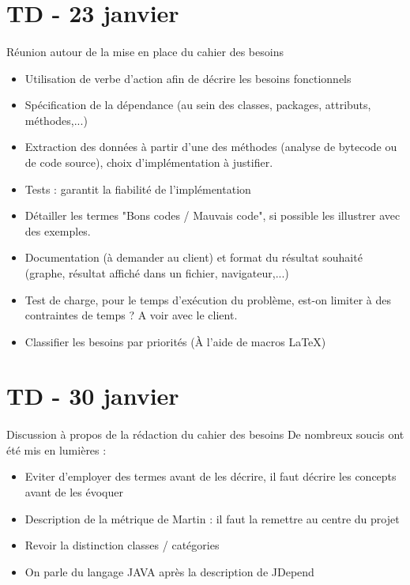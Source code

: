 \documentclass{scrartcl}
\begin{document}
\section{TD - 23 janvier}
\paragraph{}Réunion autour de la mise en place du cahier des besoins
\begin{itemize}
    \item Utilisation de verbe d'action afin de décrire les besoins fonctionnels
    \item Spécification de la dépendance (au sein des classes, packages, attributs, méthodes,...)
    \item Extraction des données à partir d'une des méthodes (analyse de bytecode ou de code source), choix d'implémentation à justifier.
    \item Tests : garantit la fiabilité de l'implémentation
    \item Détailler les termes "Bons codes / Mauvais code", si possible les illustrer avec des exemples.
    \item Documentation (à demander au client) et format du résultat souhaité (graphe, résultat affiché dans un fichier, navigateur,...)
    \item Test de charge, pour le temps d'exécution du problème, est-on limiter à des contraintes de temps ? A voir avec le client.
    \item Classifier les besoins par priorités (À l'aide de macros \LaTeX{}) 
\end{itemize}

\section{TD - 30 janvier}
\paragraph{}Discussion à propos de la rédaction du cahier des besoins
\newline
De nombreux soucis ont été mis en lumières : 
\begin{itemize}
    \item Eviter d'employer des termes avant de les décrire, il faut décrire les concepts avant de les évoquer 
    \item Description de la métrique de Martin : il faut la remettre au centre du projet
    \item Revoir la distinction classes / catégories
    \item On parle du langage JAVA après la description de JDepend
\end{itemize}    
    
\end{document}
